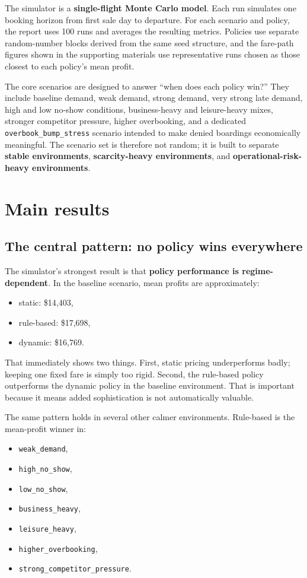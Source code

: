 \documentclass[11pt,a4paper]{article}
\begin{document}
The simulator is a \textbf{single-flight Monte Carlo model}. Each run simulates one booking horizon from first sale day to departure. For each scenario and policy, the report uses 100 runs and averages the resulting metrics. Policies use separate random-number blocks derived from the same seed structure, and the fare-path figures shown in the supporting materials use representative runs chosen as those closest to each policy's mean profit.

The core scenarios are designed to answer ``when does each policy win?'' They include baseline demand, weak demand, strong demand, very strong late demand, high and low no-show conditions, business-heavy and leisure-heavy mixes, stronger competitor pressure, higher overbooking, and a dedicated \texttt{overbook\_bump\_stress} scenario intended to make denied boardings economically meaningful. The scenario set is therefore not random; it is built to separate \textbf{stable environments}, \textbf{scarcity-heavy environments}, and \textbf{operational-risk-heavy environments}.

\section{Main results}

\subsection{The central pattern: no policy wins everywhere}

The simulator's strongest result is that \textbf{policy performance is regime-dependent}. In the baseline scenario, mean profits are approximately:
\begin{itemize}
  \item static: \$14{,}403,
  \item rule-based: \$17{,}698,
  \item dynamic: \$16{,}769.
\end{itemize}
That immediately shows two things. First, static pricing underperforms badly; keeping one fixed fare is simply too rigid. Second, the rule-based policy outperforms the dynamic policy in the baseline environment. That is important because it means added sophistication is not automatically valuable.

The same pattern holds in several other calmer environments. Rule-based is the mean-profit winner in:
\begin{itemize}
  \item \texttt{weak\_demand},
  \item \texttt{high\_no\_show},
  \item \texttt{low\_no\_show},
  \item \texttt{business\_heavy},
  \item \texttt{leisure\_heavy},
  \item \texttt{higher\_overbooking},
  \item \texttt{strong\_competitor\_pressure}.
\end{itemize}
\end{document}
